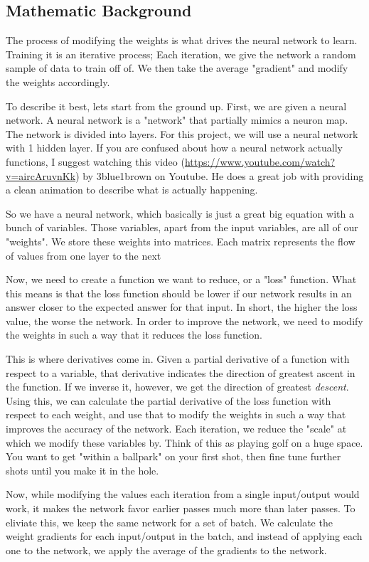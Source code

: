 \documentclass[10pt]{article}
\begin{document}
\subsection{Mathematic Background}
The process of modifying the weights is what drives the neural network to learn. Training it is an iterative process; Each iteration, we give the network a random sample of data to train off of. We then take the average "gradient" and modify the weights accordingly.\par
To describe it best, lets start from the ground up. First, we are given a neural network. A neural network is a "network" that partially mimics a neuron map. The network is divided into layers. For this project, we will use a neural network with 1 hidden layer. If you are confused about how a neural network actually functions, I suggest watching this video (\url{https://www.youtube.com/watch?v=aircAruvnKk}) by 3blue1brown on Youtube. He does a great job with providing a clean animation to describe what is actually happening.\par
So we have a neural network, which basically is just a great big equation with a bunch of variables. Those variables, apart from the input variables, are all of our "weights". We store these weights into matrices. Each matrix represents the flow of values from one layer to the next\par
Now, we need to create a function we want to reduce, or a "loss" function. What this means is that the loss function should be lower if our network results in an answer closer to the expected answer for that input. In short, the higher the loss value, the worse the network. In order to improve the network, we need to modify the weights in such a way that it reduces the loss function.\par
This is where derivatives come in. Given a partial derivative of a function with respect to a variable, that derivative indicates the direction of greatest ascent in the function. If we inverse it, however, we get the direction of greatest \textit{descent}. Using this, we can calculate the partial derivative of the loss function with respect to each weight, and use that to modify the weights in such a way that improves the accuracy of the network. Each iteration, we reduce the "scale" at which we modify these variables by. Think of this as playing golf on a huge space. You want to get "within a ballpark" on your first shot, then fine tune further shots until you make it in the hole.\par
Now, while modifying the values each iteration from a single input/output would work, it makes the network favor earlier passes much more than later passes. To eliviate this, we keep the same network for a set of batch. We calculate the weight gradients for each input/output in the batch, and instead of applying each one to the network, we apply the average of the gradients to the network.\par
\end{document}
